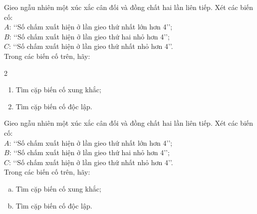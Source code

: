 \begin{bt}%
	Gieo ngẫu nhiên một xúc xắc cân đối và đồng chất hai lần liên tiếp. Xét các biến cố:\\
	$A$: \lq\lq Số chấm xuất hiện ở lần gieo thứ nhất lớn hơn 4\rq\rq ;\\
	$B$: \lq\lq Số chấm xuất hiện ở lần gieo thứ hai nhỏ hơn 4\rq\rq ;\\
	$C$: \lq\lq Số chấm xuất hiện ở lần gieo thứ nhất nhỏ hơn 4\rq\rq.\\
	Trong các biến cố trên, hãy:
	\begin{multicols}{2}
		\begin{enumerate}
			\item Tìm cặp biến cố xung khắc;
			\item Tìm cặp biến cố độc lập.
		\end{enumerate}
	\end{multicols}
\end{bt}

\begin{bt}%
	Gieo ngẫu nhiên một xúc xắc cân đối và đồng chất hai lần liên tiếp. Xét các biến cố:\\
	$A$: \lq\lq Số chấm xuất hiện ở lần gieo thứ nhất lớn hơn 4\rq\rq ;\\
	$B$: \lq\lq Số chấm xuất hiện ở lần gieo thứ hai nhỏ hơn 4\rq\rq ;\\
	$C$: \lq\lq Số chấm xuất hiện ở lần gieo thứ nhất nhỏ hơn 4\rq\rq.\\
	Trong các biến cố trên, hãy:
	\begin{enumerate}[a)]
		\item Tìm cặp biến cố xung khắc;
		\item Tìm cặp biến cố độc lập.
	\end{enumerate}
\end{bt}

